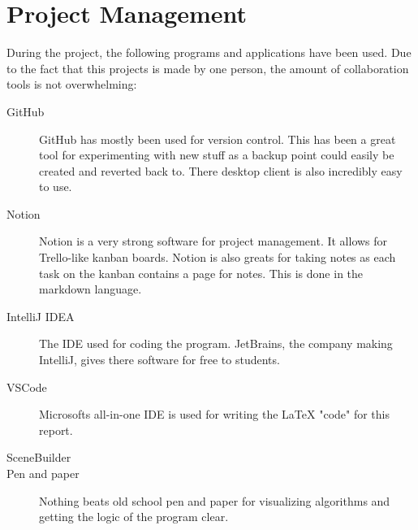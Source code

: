 
\section{Project Management}

During the project, the following programs and applications have been used. Due
to the fact that this projects is made by one person, the amount of
collaboration tools is not overwhelming: 

\begin{description}
    \item[GitHub] GitHub has mostly been used for version control. This has been
    a great tool for experimenting with new stuff as a backup point could easily be
    created and reverted back to. There desktop client is also incredibly easy
    to use. 

    \item[Notion] Notion is a very strong software for project management. It
    allows for Trello-like kanban boards. Notion is also greats for taking notes
    as each task on the kanban contains a page for notes. This is done in the
    markdown language. 

    \item[IntelliJ IDEA] The IDE used for coding the program. JetBrains, the
    company making IntelliJ, gives there software for free to students. 

    \item[VSCode] Microsofts all-in-one IDE is used for writing the {\LaTeX}
    "code" for this report. 

    \item[SceneBuilder]

    \item[Pen and paper] Nothing beats old school pen and paper for visualizing
    algorithms and getting the logic of the program clear. 
\end{description}

